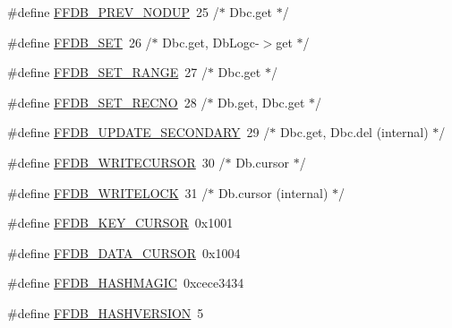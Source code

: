 \begin{DoxyCompactItemize}
\item 
\#define \mbox{\hyperlink{adat-devel_2other__libs_2filedb_2filehash_2ffdb__db_8h_a147454502f95282c4080fa748b433802}{F\+F\+D\+B\+\_\+\+P\+R\+E\+V\+\_\+\+N\+O\+D\+UP}}~25	/$\ast$ Dbc.\+get $\ast$/
\item 
\#define \mbox{\hyperlink{adat-devel_2other__libs_2filedb_2filehash_2ffdb__db_8h_a1c8909bf55e6c2ec4d5d0ae5011d1476}{F\+F\+D\+B\+\_\+\+S\+ET}}~26	/$\ast$ Dbc.\+get, Db\+Logc-\/$>$get $\ast$/
\item 
\#define \mbox{\hyperlink{adat-devel_2other__libs_2filedb_2filehash_2ffdb__db_8h_a3bbaab84659db127fd2140733e469914}{F\+F\+D\+B\+\_\+\+S\+E\+T\+\_\+\+R\+A\+N\+GE}}~27	/$\ast$ Dbc.\+get $\ast$/
\item 
\#define \mbox{\hyperlink{adat-devel_2other__libs_2filedb_2filehash_2ffdb__db_8h_aeb37d445c9d63ca4da0047c781a90df5}{F\+F\+D\+B\+\_\+\+S\+E\+T\+\_\+\+R\+E\+C\+NO}}~28	/$\ast$ Db.\+get, Dbc.\+get $\ast$/
\item 
\#define \mbox{\hyperlink{adat-devel_2other__libs_2filedb_2filehash_2ffdb__db_8h_a85f1be5817eaecd37aa641bd73f1dffd}{F\+F\+D\+B\+\_\+\+U\+P\+D\+A\+T\+E\+\_\+\+S\+E\+C\+O\+N\+D\+A\+RY}}~29	/$\ast$ Dbc.\+get, Dbc.\+del (internal) $\ast$/
\item 
\#define \mbox{\hyperlink{adat-devel_2other__libs_2filedb_2filehash_2ffdb__db_8h_ad25496c57e5c04463c1a819c3d92697e}{F\+F\+D\+B\+\_\+\+W\+R\+I\+T\+E\+C\+U\+R\+S\+OR}}~30	/$\ast$ Db.\+cursor $\ast$/
\item 
\#define \mbox{\hyperlink{adat-devel_2other__libs_2filedb_2filehash_2ffdb__db_8h_a08af4b34551239cae969b2ac05dc9ee4}{F\+F\+D\+B\+\_\+\+W\+R\+I\+T\+E\+L\+O\+CK}}~31	/$\ast$ Db.\+cursor (internal) $\ast$/
\item 
\#define \mbox{\hyperlink{adat-devel_2other__libs_2filedb_2filehash_2ffdb__db_8h_a3d9e5d98bf80b7f4c6b5c58bb13d4d99}{F\+F\+D\+B\+\_\+\+K\+E\+Y\+\_\+\+C\+U\+R\+S\+OR}}~0x1001
\item 
\#define \mbox{\hyperlink{adat-devel_2other__libs_2filedb_2filehash_2ffdb__db_8h_ab59bd751c13302853f419043692da4c8}{F\+F\+D\+B\+\_\+\+D\+A\+T\+A\+\_\+\+C\+U\+R\+S\+OR}}~0x1004
\item 
\#define \mbox{\hyperlink{adat-devel_2other__libs_2filedb_2filehash_2ffdb__db_8h_ae25d31d663387dfefad27b8700bae9e9}{F\+F\+D\+B\+\_\+\+H\+A\+S\+H\+M\+A\+G\+IC}}~0xcece3434
\item 
\#define \mbox{\hyperlink{adat-devel_2other__libs_2filedb_2filehash_2ffdb__db_8h_af35cc8791e2215c249519987fea42ee3}{F\+F\+D\+B\+\_\+\+H\+A\+S\+H\+V\+E\+R\+S\+I\+ON}}~5

\end{DoxyCompactItemize}
